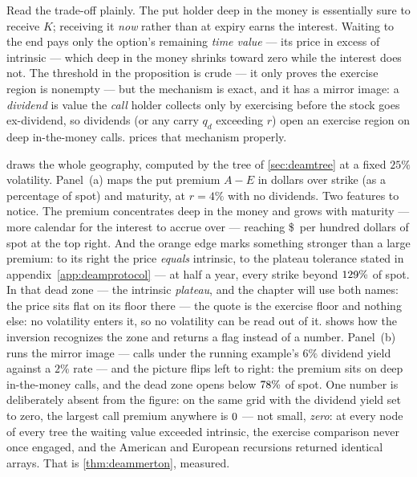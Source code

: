 Read the trade-off plainly.  The put holder deep in the money is
essentially sure to receive $K$; receiving it \emph{now} rather than
at expiry earns the interest.  Waiting to the end pays only the
option's remaining \emph{time value} --- its price in excess of
intrinsic --- which deep in the money shrinks toward zero while the
interest does not.  The threshold in the proposition is
crude --- it only proves the exercise region is nonempty --- but the
mechanism is exact, and it has a mirror image: a \emph{dividend} is
value the \emph{call} holder collects only by exercising before the
stock goes ex-dividend, so dividends (or any carry $q_d$ exceeding
$r$) open an exercise region on deep in-the-money calls.
 prices that mechanism properly.

 draws the whole geography, computed by the tree of
\cref{sec:deamtree} at a fixed $25\%$ volatility.  Panel~(a) maps the
put premium $A-E$ in dollars over strike (as a percentage of spot) and
maturity, at $r=4\%$ with no dividends.  Two features to notice.
The premium concentrates deep in the money and grows with maturity ---
more calendar for the interest to accrue over --- reaching
\$\MacDeamMapPutMaxDollars\ per hundred dollars of spot at the top
right.  And the orange edge marks something stronger than a large
premium: to its right the price \emph{equals} intrinsic, to the
plateau tolerance stated in appendix~\ref{app:deamprotocol} --- at
half a year, every strike beyond $129\%$ of spot.
In that dead zone --- the intrinsic \emph{plateau}, and the chapter
will use both names: the price sits flat on its floor there --- the
quote is the exercise floor and nothing else: no volatility enters
it, so no volatility can be read out of it.
 shows how the inversion recognizes the zone and
returns a flag instead of a number.  Panel~(b) runs the mirror image --- calls under
the running example's $6\%$ dividend yield against a $2\%$ rate ---
and the picture flips left to right: the premium sits on deep
in-the-money calls, and the dead zone opens below
$78\%$ of spot.  One number is deliberately absent
from the figure: on the same grid with the dividend yield set to zero,
the largest call premium anywhere is
$0$ --- not small, \emph{zero}: at every
node of every tree the waiting value exceeded intrinsic, the exercise
comparison never once engaged, and the American and European
recursions returned identical arrays.  That is \cref{thm:deammerton},
measured.


